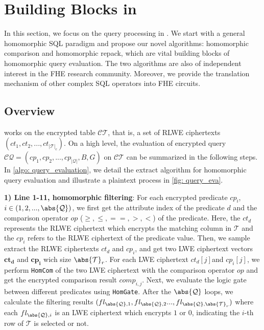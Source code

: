 \section{Building Blocks in \NAME}
In this section, we focus on the query processing in \NAME. 
We start with a general homomorphic SQL paradigm and 
propose our novel algorithms: 
homomorphic comparison and homomorphic repack, 
which are vital building blocks of homomorphic query evaluation. 
The two algorithms are also of 
independent interest in the FHE research community.
Moreover, we provide the translation mechanism of 
other complex SQL operators into FHE circuits.

\subsection{Overview}
\NAME works on the encrypted table $\mathcal{CT}$, that is, 
a set of RLWE ciphertexts 
$(ct_1, ct_2, ..., ct_{\lvert \mathcal{T} \rvert_{c}})$.
On a high level, the evaluation of encrypted query 
$\mathcal{CQ} = (cp_{1}, cp_{2}, ... ,cp_{\lvert \mathcal{Q} \rvert}, B, G)$ 
on $\mathcal{CT}$  
can be summarized in the following steps.
In \cref{algo: query_evaluation}, we detail the extract algorithm
for homomorphic query evaluation and illustrate a plaintext process
in \cref{fig: query_eva}.

\textbf{1) Line 1-11, homomorphic filtering}: 
For each encrypted predicate $cp_i$, 
$i \in (1, 2, ..., \abs{\mathcal{Q}})$, 
we first get the attribute index of the predicate $d$ 
and the comparison operator $op$
($\geq, \leq, ==, >, <$) of the predicate.
Here, the $ct_d$ represents the RLWE ciphertext which
encrypts the matching column in $\mathcal{T}$
and the $cp_i$ refers to the RLWE ciphertext of the predicate value.
Then, we sample extract the RLWE ciphertexts $ct_d$ and $cp_i$, 
and get two LWE ciphertext vectors
$\mathbf{ct_d}$ and $\mathbf{cp_i}$ wich size $\abs{\mathcal{T}}_{r}$.
For each LWE ciphertext $ct_d[j]$and $cp_i[j]$, 
we perform \texttt{HomCom} of the two LWE ciphertext
with the comparison operator $op$
and get the encrypted comparison result $comp_{i,j}$.
Next, we evaluate the logic gate between different predicates 
using \texttt{HomGate}.
After the $\abs{\mathcal{Q}}$ loops, 
we calculate the filtering results 
$(fl_{\abs{\mathcal{Q}}, 1},
fl_{\abs{\mathcal{Q}}, 2}...,
fl_{\abs{\mathcal{Q}}, \abs{\mathcal{T}}_{r}})$
where each $fl_{\abs{\mathcal{Q}}, i}$ is an LWE
ciphertext which encrypts $1$ or $0$, 
indicating the $i$-th row of $\mathcal{T}$
is selected or not.

